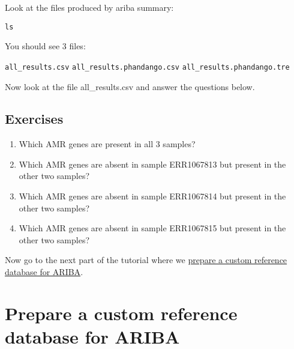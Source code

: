 \documentclass[11pt]{article}
\makeatletter
\providecommand{\tightlist}{%
      \setlength{\itemsep}{0pt}\setlength{\parskip}{0pt}}
\newcommand{\boxspacing}{\kern\kvtcb@left@rule\kern\kvtcb@boxsep}
\newcommand{\prompt}[4]{
         {\ttfamily\llap{{\color{blue}\LARGE\faKeyboardO\hspace{3pt}#4}}\vspace{-\baselineskip}}
    }
\makeatother
\begin{document}
    Look at the files produced by ariba summary:

    \begin{tcolorbox}[breakable, size=fbox, boxrule=1pt, pad at break*=1mm,colback=cellbackground, colframe=cellborder]
\prompt{In}{incolor}{ }{\boxspacing}
\begin{Verbatim}[commandchars=\\\{\}]
ls
\end{Verbatim}
\end{tcolorbox}

    You should see 3 files:

\texttt{all\_results.csv} \texttt{all\_results.phandango.csv}
\texttt{all\_results.phandango.tre}

Now look at the file all\_results.csv and answer the questions below.

    \hypertarget{exercises}{%
\subsection{Exercises}\label{exercises}}

\begin{enumerate}
\def\labelenumi{\arabic{enumi}.}
\tightlist
\item
  Which AMR genes are present in all 3 samples?
\item
  Which AMR genes are absent in sample ERR1067813 but present in the
  other two samples?
\item
  Which AMR genes are absent in sample ERR1067814 but present in the
  other two samples?
\item
  Which AMR genes are absent in sample ERR1067815 but present in the
  other two samples?
\end{enumerate}

    Now go to the next part of the tutorial where we
\href{make_custom_db.ipynb}{prepare a custom reference database for
ARIBA}.





\newpage





    \hypertarget{prepare-a-custom-reference-database-for-ariba}{%
\section{Prepare a custom reference database for
ARIBA}\label{prepare-a-custom-reference-database-for-ariba}}
\end{document}

